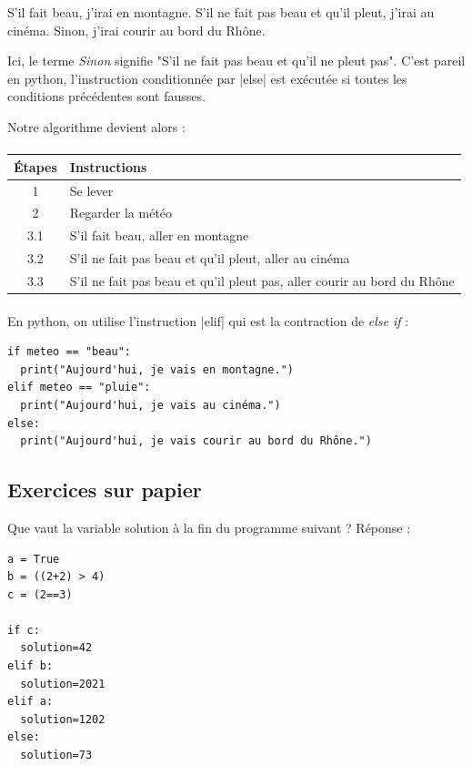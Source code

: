 \documentclass[11pt, a4paper]{book}
\begin{document}
 \begin{example} S'il fait beau, j'irai en montagne. S'il ne fait pas beau et qu'il pleut, j'irai au cinéma. Sinon, j'irai courir au bord du Rhône. \end{example}
 
 \begin{remarque} Ici, le terme \textit{Sinon} signifie "S'il ne fait pas beau et qu'il ne pleut pas". C'est pareil en python, l'instruction conditionnée par |else| est exécutée si toutes les conditions précédentes sont fausses. \end{remarque}
 
 Notre algorithme devient alors : 
 
\paragraph{}
\begin{tabular}{ c  l  }
     Étapes & Instructions \\ \hline
     1 & Se lever  \\ 
     2 & Regarder la météo  \\
     3.1 & S'il fait beau, aller en montagne  \\
     3.2 & S'il ne fait pas beau et qu'il pleut, aller au cinéma  \\
     3.3 & S'il ne fait pas beau et qu'il pleut pas, aller courir au bord du Rhône \\
\end{tabular}

\paragraph{}
En python, on utilise l'instruction |elif| qui est la contraction de \textit{else if} :

\begin{lstlisting}
if meteo == "beau":
  print("Aujourd'hui, je vais en montagne.")
elif meteo == "pluie":
  print("Aujourd'hui, je vais au cinéma.")
else:
  print("Aujourd'hui, je vais courir au bord du Rhône.")
\end{lstlisting}


\subsection{Exercices sur papier}

\begin{exercice}
Que vaut la variable solution à la fin du programme suivant ? %
Réponse : 

\end{exercice}
\begin{lstlisting}
a = True
b = ((2+2) > 4)
c = (2==3)

if c:
  solution=42
elif b:
  solution=2021
elif a:
  solution=1202
else:
  solution=73
\end{lstlisting}
\end{document}

